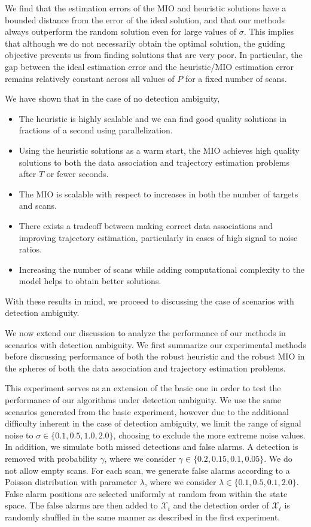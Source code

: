 We find that the estimation errors of the MIO and heuristic solutions have a bounded distance from the error of the ideal solution, and that our methods always outperform the random solution even for large values of $\sigma$. This implies that although we do not necessarily obtain the optimal solution, the guiding objective prevents us from finding solutions that are very poor. In particular, the gap between the ideal estimation error and the heuristic/MIO estimation error remains relatively constant across all values of $P$ for a fixed number of scans. 

We have shown that in the case of no detection ambiguity,
\begin{itemize}
\item The heuristic is highly scalable and we can find good quality solutions in fractions of a second using parallelization. 
\item Using the heuristic solutions as a warm start, the MIO achieves high quality solutions to both the data association and trajectory estimation problems after $T$ or fewer seconds. 
\item The MIO is scalable with respect to increases in both the number of targets and scans.
\item There exists a tradeoff between making correct data associations and improving trajectory estimation, particularly in cases of high signal to noise ratios. 
\item Increasing the number of scans while adding computational complexity to the model helps to obtain better solutions. 
\end{itemize}
With these results in mind, we proceed to discussing the case of scenarios with detection ambiguity. 

We now extend our discussion to analyze the performance of our methods in scenarios with detection ambiguity. We first summarize our experimental methods before discussing performance of both the robust heuristic and the robust MIO in the spheres of both the data association and trajectory estimation problems.

This experiment serves as an extension of the basic one in order to test the performance of our algorithms under detection ambiguity. We use the same scenarios generated from the basic experiment, however due to the additional difficulty inherent in the case of detection ambiguity, we limit the range of signal noise to $\sigma \in \{0.1,0.5,1.0,2.0\}$, choosing to exclude the more extreme noise values. In addition, we simulate both missed detections and false alarms. A detection is removed with probability $\gamma$, where we consider $\gamma \in \{0.2,0.15,0.1,0.05\}$. We do not allow empty scans. For each scan, we generate false alarms according to a Poisson distribution with parameter $\lambda$, where we consider $\lambda \in \{0.1,0.5,0.1,2.0\}$. False alarm positions are selected uniformly at random from within the state space. The false alarms are then added to $\mathcal{X}_{t}$ and the detection order of $\mathcal{X}_{t}$ is randomly shuffled in the same manner as described in the first experiment. 

